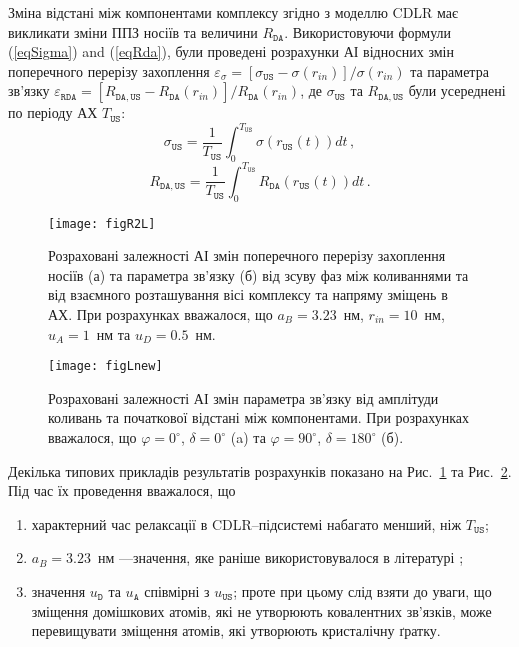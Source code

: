 Зміна відстані між компонентами комплексу згідно з моделлю CDLR має викликати зміни
ППЗ носіїв та величини $R_\mathtt{DA}$.
Використовуючи формули (\ref{eqSigma}) and (\ref{eqRda}), були проведені розрахунки
АІ відносних змін поперечного перерізу захоплення
$\varepsilon_\sigma=[\sigma_{\mathtt{US}}-\sigma(r_{in})]/\sigma(r_{in})$
та параметра зв'язку
$\varepsilon_{\mathtt{RDA}}=[R_{\mathtt{DA,US}}-R_\mathtt{DA}(r_{in})]/R_\mathtt{DA}(r_{in})$,
де $\sigma_{\mathtt{US}}$ та $R_{\mathtt{DA,US}}$ були усереднені по періоду АХ $T_\mathtt{US}$:
\begin{equation}
\label{eqAverSigma}
\sigma_{\mathtt{US}}=\frac{1}{T_\mathtt{US}}\int^{T_\mathtt{US}}_0\!\!\!\!\!\!\sigma(r_\mathtt{US}(t))dt\,,
\end{equation}
\begin{equation}
\label{eqAverRda}
R_{\mathtt{DA,US}}=\frac{1}{T_\mathtt{US}}\int^{T_\mathtt{US}}_0\!\!\!\!\!\!R_{\mathtt{DA}}(r_\mathtt{US}(t))dt\,.
\end{equation}


\begin{figure}
\center
\texttt{[image: figR2L]}
\caption{\label{figR2L}
Розраховані залежності  АІ змін поперечного перерізу захоплення носіїв (а) та параметра зв'язку (б) від зсуву фаз між коливаннями та від взаємного
розташування вісі комплексу та напряму зміщень в АХ.
При розрахунках вважалося, що $a_B=3.23$~нм, $r_{in}=10$~нм, $u_A=1$~нм та $u_D=0.5$~нм.
}%
\end{figure}

\begin{figure}
\center
\texttt{[image: figLnew]}
\caption{\label{figLnew}
Розраховані залежності  АІ змін параметра зв'язку від амплітуди коливань та початкової відстані між компонентами.
При розрахунках вважалося, що $\varphi=0^\circ$, $\delta=0^\circ$ (a) та $\varphi=90^\circ$, $\delta=180^\circ$ (б).
}%
\end{figure}

Декілька типових прикладів результатів розрахунків показано на Рис.~\ref{figR2L} та Рис.~\ref{figLnew}.
Під час їх проведення вважалося, що
\begin{enumerate}[label=\asbuk*),leftmargin=0em,itemindent=1.5em]
\item характерний час релаксації в CDLR--підсистемі набагато менший, ніж $T_\mathtt{US}$;
\item $a_B=3.23$~нм ---значення, яке раніше використовувалося в літературі \cite{CDLR:JAP};
\item значення $u_\mathtt{D}$ та $u_\mathtt{A}$ співмірні з $u_\mathtt{US}$;
   проте при цьому слід взяти до уваги, що зміщення домішкових атомів, які не утворюють ковалентних зв'язків, може перевищувати
   зміщення атомів, які утворюють кристалічну ґратку.
\end{enumerate}

